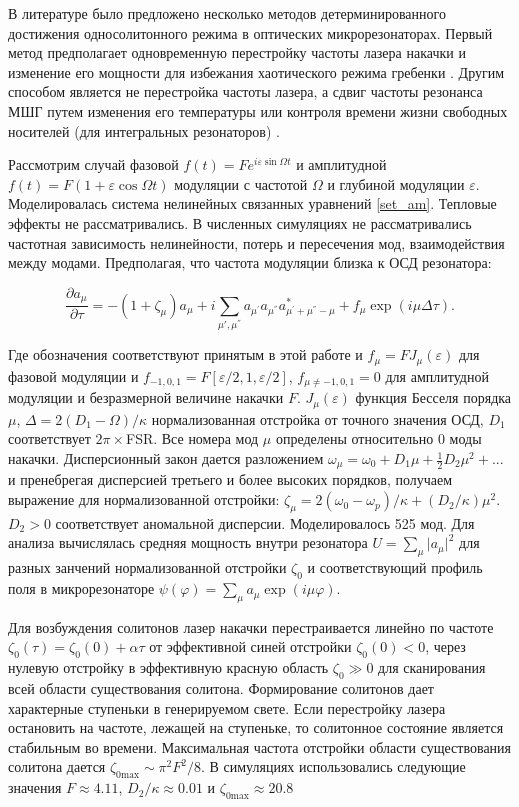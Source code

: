 В литературе было предложено несколько методов детерминированного достижения односолитонного режима в оптических микрорезонаторах. Первый метод предполагает одновременную перестройку частоты лазера накачки и изменение его мощности для избежания хаотического режима гребенки \cite{Jaramillo2015}. Другим способом является не перестройка частоты лазера, а сдвиг частоты резонанса МШГ путем изменения его температуры \cite{Joshi2016} или контроля времени жизни свободных носителей (для интегральных резонаторов) \cite{Yu2016}.

Рассмотрим случай \cite{Lobanov2016} фазовой $f(t)=F e^{i\varepsilon\sin\Omega t}$ и амплитудной $f(t)=F(1+\varepsilon\cos\Omega t)$  модуляции с частотой $\Omega$ и глубиной модуляции $\varepsilon$. Моделировалась система нелинейных связанных уравнений \ref{set_am}. Тепловые эффекты не рассматривались. В численных симуляциях не рассматривались частотная зависимость нелинейности, потерь и пересечения мод, взаимодействия между модами. Предполагая, что частота модуляции близка к ОСД резонатора:

\begin{equation}
\frac{\partial a_\mu}{\partial \tau}=-(1+\zeta_\mu)a_\mu+i\sum_{\mu',\mu^{''}}a_{\mu^{'}} a_{\mu^{''}} a^{*}_{\mu^{'}+\mu^{''}-\mu}+f_{\mu}\exp(i\mu\Delta\tau).
\end{equation}

Где обозначения соответствуют принятым в этой работе и $f_\mu=F J_\mu(\varepsilon)$ для фазовой модуляции и $f_{-1,0,1}=F[\varepsilon/2,1,\varepsilon/2]$,  $f_{\mu \neq -1,0,1}=0$ для амплитудной модуляции и безразмерной величине накачки $F$. $J_\mu(\varepsilon)$ функция Бесселя порядка $\mu$, $\Delta=2(D_1-\Omega)/\kappa$ нормализованная отстройка от точного значения ОСД, $D_1$ соответствует $2\pi\times$FSR. Все номера мод $\mu$ определены относительно 0 моды накачки. Дисперсионный закон дается разложением $\omega_\mu=\omega_0+D_1\mu+\frac{1}{2}D_2\mu^2+...$ и пренебрегая дисперсией третьего и более высоких порядков, получаем выражение для нормализованной отстройки: $\zeta_\mu=2(\omega_0-\omega_p)/\kappa+(D_2/\kappa)\mu^2$. $D_2>0$ соответствует аномальной дисперсии. Моделировалось 525 мод. Для анализа вычислялась средняя мощность внутри резонатора $U=\sum_{\mu} \vert a_\mu\vert^2$ для разных занчений нормализованной отстройки $\zeta_0$ и соответствующий профиль поля в микрорезонаторе $\psi(\varphi)=\sum_{\mu} a_{\mu}\exp(i\mu\varphi)$.

Для возбуждения солитонов лазер накачки перестраивается линейно по частоте $\zeta_{0}(\tau)=\zeta_{0}(0)+\alpha\tau$ от эффективной синей отстройки $\zeta_0(0)<0$, через нулевую отстройку в эффективную красную область $\zeta_0\gg0$ для сканирования всей области существования солитона. Формирование солитонов дает характерные ступеньки в генерируемом свете. Если перестройку лазера остановить на частоте, лежащей на ступеньке, то солитонное состояние является стабильным во времени. Максимальная частота отстройки области существования солитона \cite{Herr2014} дается $\zeta_{0\text{max}}\sim {\pi^2 F^2}/{8}$. В симуляциях использовались следующие значения $F\approx 4.11$, $D_{2}/\kappa\approx {0.01}$ и $\zeta_{0\text{max}}\approx 20.8$

